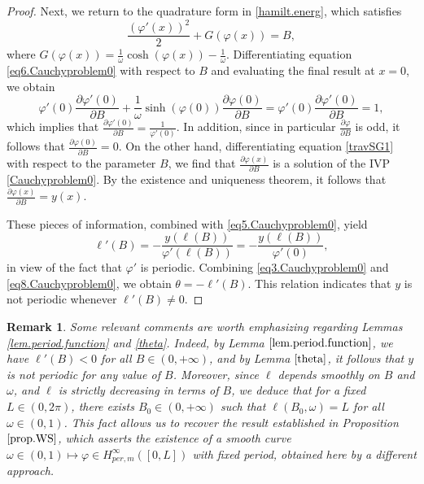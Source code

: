 \documentclass[12pt,reqno,a4paper]{amsart} %
\numberwithin{equation}{section}
\numberwithin{figure}{section}
\newtheorem{remark}[theorem]{Remark}
\begin{document}
\begin{proof}
 	Next, we return to the quadrature form in \eqref{hamilt.energ}, which satisfies
 	\begin{equation}\label{eq6.Cauchyproblem0}
 		\frac{(\varphi'(x))^2}{2} + G(\varphi(x)) = B,
 	\end{equation}
 	where $\displaystyle G(\varphi(x)) = \frac{1}{\omega}\cosh(\varphi(x)) - \frac{1}{\omega}$. Differentiating equation \eqref{eq6.Cauchyproblem0} with respect to $B$ and evaluating the final result at $x = 0$, we obtain
 	\begin{equation*}
 		\varphi'(0) \frac{\partial \varphi'(0)}{\partial B} + \frac{1}{\omega}\sinh(\varphi(0)) \frac{\partial \varphi(0)}{\partial B} =\varphi'(0) \frac{\partial \varphi'(0)}{\partial B}= 1,
 	\end{equation*}
 	which implies that $\frac{\partial \varphi'(0)}{\partial B} = \frac{1}{\varphi'(0)}$. In addition, since in particular $\frac{\partial \varphi }{\partial B}$ is odd, it follows that $\frac{\partial \varphi(0)}{\partial B}=0$. On the other hand, differentiating equation \eqref{travSG1} with respect to the parameter $B$, we find that $\frac{\partial \varphi(x)}{\partial B}$ is a solution of the IVP \eqref{Cauchyproblem0}. By the existence and uniqueness theorem, it follows that $\frac{\partial \varphi(x)}{\partial B} = y(x)$.
 	
 These pieces of information, combined with \eqref{eq5.Cauchyproblem0}, yield
 \begin{equation}\label{eq8.Cauchyproblem0}
 	\ell'(B) = -\frac{y(\ell(B))}{\varphi'(\ell(B))} = -\frac{y(\ell(B))}{\varphi'(0)},
 \end{equation}
 in view of the fact that $\varphi'$ is periodic. Combining \eqref{eq3.Cauchyproblem0} and \eqref{eq8.Cauchyproblem0}, we obtain $\theta = -\ell'(B)$. This relation indicates that $y$ is not periodic whenever $\ell'(B) \neq 0$.
 		
 \end{proof}
 	\begin{remark} Some relevant comments are worth emphasizing regarding Lemmas \ref{lem.period.function} and \ref{theta}. Indeed, by Lemma $\ref{lem.period.function}$, we have $\ell'(B) < 0$ for all $B \in (0, +\infty)$, and by Lemma $\ref{theta}$, it follows that $y$ is not periodic for any value of $B$. Moreover, since $\ell$ depends smoothly on $B$ and $\omega$, and $\ell$ is strictly decreasing in terms of $B$, we deduce that for a fixed $L \in (0, 2\pi)$, there exists $B_0 \in (0, +\infty)$ such that $\ell(B_0, \omega) = L$ for all $\omega \in (0, 1)$. This fact allows us to recover the result established in Proposition $\ref{prop.WS}$, which asserts the existence of a smooth curve $\omega \in (0, 1) \mapsto \varphi \in H_{per,m}^{\infty}([0, L])$ with fixed period, obtained here by a different approach.	 		
 	\end{remark}
 	
\end{document}
